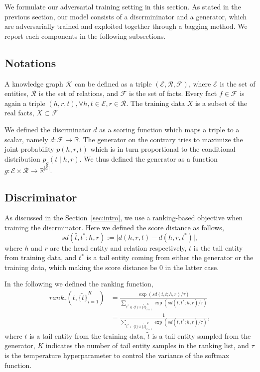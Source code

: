 \documentclass[twocolumn,a4paper,10pt,review,5p]{elsarticle}
\begin{document}
We formulate our adversarial training setting in this section. As stated in the previous section, our model consists of a discrmininator and a generator, which are adversarially trained and exploited together through a bagging method. We report each components in the following subsections.

\subsection{Notations}

A knowledge graph $\mathcal{K}$ can be defined as a triple $(\mathcal{E}, \mathcal{R}, \mathcal{F})$, where $\mathcal{E}$ is the set of entities, $\mathcal{R}$ is the set of relations, and $\mathcal{F}$ is the set of facts. Every fact $f\in \mathcal{F}$ is again a triple $(h, r, t), \forall h,t\in\mathcal{E}, r\in\mathcal{R}$. The training data $X$ is a subset of the real facts, $X \subset \mathcal{F}$

We defined the discrminator $d$ as a scoring function which maps a triple to a scalar, namely $d: \mathcal{F}\rightarrow \mathbb{R}$. The generator on the contrary tries to maximize the joint probability $p(h, r, t)$ which is in turn proportional to the conditional distribution $p_g(t \mid h, r)$. We thus defined the generator as a function $g: \mathcal{E} \times \mathcal{R} \rightarrow \mathbb{R}^{\lvert \mathcal{E} \rvert}$.

\subsection{Discriminator}

As discussed in the Section~\ref{sec:intro}, we use a ranking-based objective when training the discrminator. Here we defined the score distance as follows,
\[
    sd(\hat t, t^*; h, r) := \lvert d(h, r, t) - d(h, r, t^*) \rvert,
\]
where $h$ and $r$ are the head entity and relation respectively, $t$ is the tail entity from training data, and $t^*$ is a tail entity coming from either the generator or the training data, which making the score distance be 0 in the latter case.

In the following we defined the ranking function,
\begin{align*}
    rank_\tau(t, {\{\tilde t \}}_{i=1}^K)
    &= \frac{\exp(sd(t, t; h, r) / \tau)}
        {\sum_{t^*\in \{t\} \cup {\{\tilde t \}}_{i=1}^K } \exp (sd(t, t^*; h, r) / \tau) } \\
    &= \frac{1}
        {\sum_{t^*\in \{t\} \cup {\{\tilde t \}}_{i=1}^K } \exp (sd(t, t^*; h, r) / \tau) },
\end{align*}
where $t$ is a tail entity from the training data, $\tilde t$ is a tail entity sampled from the generator, $K$ indicates the number of tail entity samples in the ranking list, and $\tau$ is the temperature hyperparameter to control the variance of the softmax function.
\end{document}
